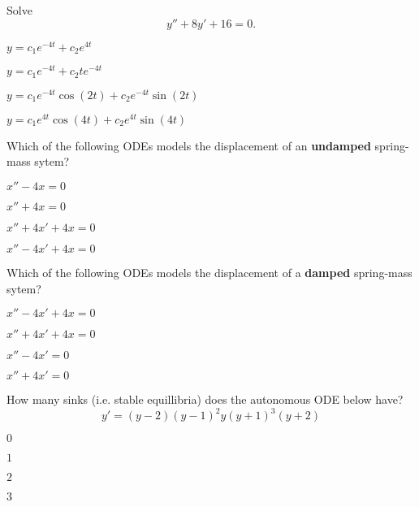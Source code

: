 \begin{readinessAssuranceTest}
\vfill
\item Solve \[y''+8y'+16=0.\]
\begin{multicols}{2}
\begin{readinessAssuranceTestChoices}
\item \(y=c_1 e^{-4t}+c_2 e^{4t}\) 
\item \(y=c_1 e^{-4t}+c_2 te^{-4t}\) %
\item \(y=c_1 e^{-4t}\cos(2t)+c_2e^{-4t}\sin(2t)\) 
\item \(y=c_1 e^{4t}\cos(4t)+c_2e^{4t}\sin(4t)\) 
\end{readinessAssuranceTestChoices}
\end{multicols}
\vfill

\newpage
\item %
Which of the following ODEs models the displacement of an \textbf{undamped} spring-mass sytem?
\begin{multicols}{4}
\begin{readinessAssuranceTestChoices}
\item \(x''-4x=0\)
\item \(x''+4x=0\) %
\item \(x''+4x'+4x=0\) 
\item \(x''-4x'+4x=0\) 
\end{readinessAssuranceTestChoices}
\end{multicols}
\vfill

\item Which of the following ODEs models the displacement of a \textbf{damped} spring-mass sytem?
\begin{multicols}{4}
\begin{readinessAssuranceTestChoices}
\item \(x''-4x'+4x=0\) 
\item \(x''+4x'+4x=0\) %
\item \(x''-4x'=0\)
\item \(x''+4x'=0\) 
\end{readinessAssuranceTestChoices}
\end{multicols}

\vfill
\item %
How many sinks (i.e. stable equillibria) does the autonomous ODE below have?
\[ y'=(y-2)(y-1)^2y(y+1)^3(y+2)\]
\begin{multicols}{4}
\begin{readinessAssuranceTestChoices}
\item \(0\) 
\item \(1\)
\item \(2\) %
\item \(3\) 
\end{readinessAssuranceTestChoices}
\end{multicols}
\vfill


\end{readinessAssuranceTest}
